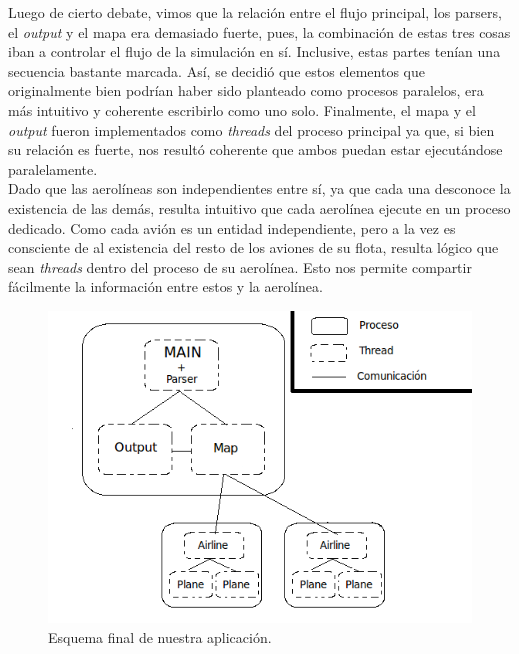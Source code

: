 \documentclass[a4paper,10pt]{article}
\begin{document}
 Luego de cierto debate, vimos que la relación entre el flujo principal, los parsers, el \textit{output} y el mapa era demasiado fuerte, pues, 
 la combinación de estas tres cosas iban a controlar el flujo de la simulación en sí. Inclusive, estas partes tenían una secuencia bastante marcada. Así, se 
decidió que estos elementos que originalmente bien podrían haber sido planteado como procesos paralelos, era más intuitivo y coherente escribirlo como uno solo.
 Finalmente, el mapa y el \textit{output} fueron implementados como \textit{threads} del proceso principal ya que, si bien su relación es fuerte, nos resultó 
coherente que ambos puedan estar ejecutándose paralelamente.\\

Dado que las aerolíneas son independientes entre sí, ya que cada una desconoce la existencia de las demás, resulta intuitivo que cada aerolínea ejecute en un 
proceso dedicado. Como cada avión es un entidad independiente, pero a la vez es consciente de al existencia del resto de los aviones de su flota, resulta lógico 
que sean \textit{threads} dentro del proceso de su aerolínea. Esto nos permite compartir fácilmente la información entre estos y la aerolínea.

\begin{figure}[H]
\begin{center}
 \includegraphics[scale=0.6]{./images/Diagrama_simulacion_1.png}
 \caption{Esquema final de nuestra aplicación.}
\end{center}
\end{figure}
\end{document}
